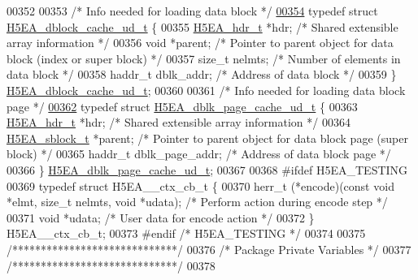 \begin{DoxyCode}
00352 
00353 \textcolor{comment}{/* Info needed for loading data block */}
\hyperlink{struct_h5_e_a__dblock__cache__ud__t}{00354} \textcolor{keyword}{typedef} \textcolor{keyword}{struct }\hyperlink{struct_h5_e_a__dblock__cache__ud__t}{H5EA\_dblock\_cache\_ud\_t} \{
00355     \hyperlink{struct_h5_e_a__hdr__t}{H5EA\_hdr\_t}    *hdr;         \textcolor{comment}{/* Shared extensible array information */}
00356     \textcolor{keywordtype}{void} *parent;               \textcolor{comment}{/* Pointer to parent object for data block (index or super block) */}
00357     \textcolor{keywordtype}{size\_t} nelmts;              \textcolor{comment}{/* Number of elements in data block */}
00358     haddr\_t dblk\_addr;          \textcolor{comment}{/* Address of data block */}
00359 \} \hyperlink{struct_h5_e_a__dblock__cache__ud__t}{H5EA\_dblock\_cache\_ud\_t};
00360 
00361 \textcolor{comment}{/* Info needed for loading data block page */}
\hyperlink{struct_h5_e_a__dblk__page__cache__ud__t}{00362} \textcolor{keyword}{typedef} \textcolor{keyword}{struct }\hyperlink{struct_h5_e_a__dblk__page__cache__ud__t}{H5EA\_dblk\_page\_cache\_ud\_t} \{
00363     \hyperlink{struct_h5_e_a__hdr__t}{H5EA\_hdr\_t}    *hdr;         \textcolor{comment}{/* Shared extensible array information */}
00364     \hyperlink{struct_h5_e_a__sblock__t}{H5EA\_sblock\_t} *parent;      \textcolor{comment}{/* Pointer to parent object for data block page (super block) 
      */}
00365     haddr\_t dblk\_page\_addr;     \textcolor{comment}{/* Address of data block page */}
00366 \} \hyperlink{struct_h5_e_a__dblk__page__cache__ud__t}{H5EA\_dblk\_page\_cache\_ud\_t};
00367 
00368 \textcolor{preprocessor}{#ifdef H5EA\_TESTING}
00369 \textcolor{keyword}{typedef} \textcolor{keyword}{struct }H5EA\_\_ctx\_cb\_t \{
00370     herr\_t (*encode)(\textcolor{keyword}{const} \textcolor{keywordtype}{void} *elmt, \textcolor{keywordtype}{size\_t} nelmts, \textcolor{keywordtype}{void} *udata);   \textcolor{comment}{/* Perform action during encode step 
      */}
00371     \textcolor{keywordtype}{void} *udata;                \textcolor{comment}{/* User data for encode action */}
00372 \} H5EA\_\_ctx\_cb\_t;
00373 \textcolor{preprocessor}{#endif }\textcolor{comment}{/* H5EA\_TESTING */}\textcolor{preprocessor}{}
00374 
00375 \textcolor{comment}{/*****************************/}
00376 \textcolor{comment}{/* Package Private Variables */}
00377 \textcolor{comment}{/*****************************/}
00378 

\end{DoxyCode}
